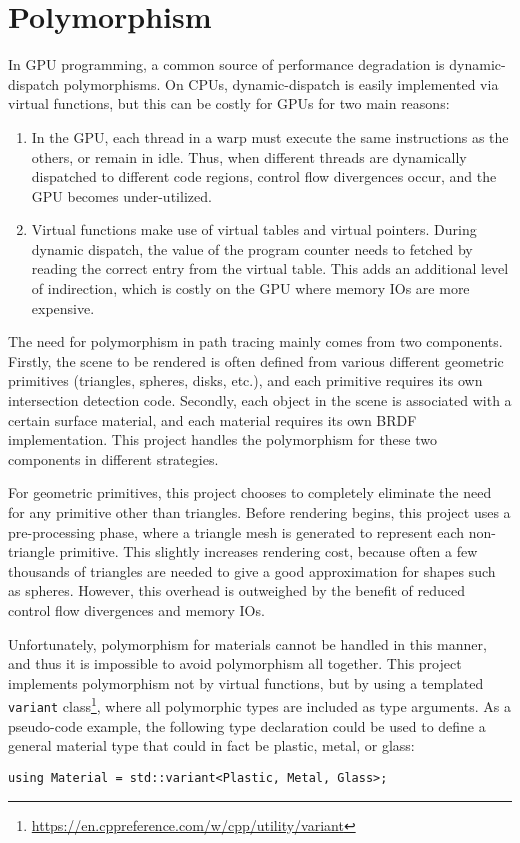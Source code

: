 \section{Polymorphism}
\label{section polymorphism}
In GPU programming, a common source of performance degradation is dynamic-dispatch polymorphisms. On CPUs, dynamic-dispatch is easily implemented via virtual functions, but this can be costly for GPUs for two main reasons:
\begin{enumerate}
    \item In the GPU, each thread in a warp must execute the same instructions as the others, or remain in idle. Thus, when different threads are dynamically dispatched to different code regions, control flow divergences occur, and the GPU becomes under-utilized.
    
    \item Virtual functions make use of virtual tables and virtual pointers. During dynamic dispatch, the value of the program counter needs to fetched by reading the correct entry from the virtual table. This adds an additional level of indirection, which is costly on the GPU where memory IOs are more expensive.
    
\end{enumerate}
The need for polymorphism in path tracing mainly comes from two components. Firstly, the scene to be rendered is often defined from various different geometric primitives (triangles, spheres, disks, etc.), and each primitive requires its own intersection detection code. Secondly, each object in the scene is associated with a certain surface material, and each material requires its own BRDF implementation. This project handles the polymorphism for these two components in different strategies.

For geometric primitives, this project chooses to completely eliminate the need for any primitive other than triangles. Before rendering begins, this project uses a pre-processing phase, where a triangle mesh is generated to represent each non-triangle primitive. This slightly increases rendering cost, because often a few thousands of triangles are needed to give a good approximation for shapes such as spheres. However, this overhead is outweighed by the benefit of reduced control flow divergences and memory IOs.

Unfortunately, polymorphism for materials cannot be handled in this manner, and thus it is impossible to avoid polymorphism all together. This project implements polymorphism not by virtual functions, but by using a templated \texttt{variant} class\footnote{\url{https://en.cppreference.com/w/cpp/utility/variant}}, where all polymorphic types are included as type arguments. As a pseudo-code example, the following type declaration could be used to define a general material type that could in fact be plastic, metal, or glass:
\begin{lstlisting}[style=cppStyle]
using Material = std::variant<Plastic, Metal, Glass>;
\end{lstlisting}

